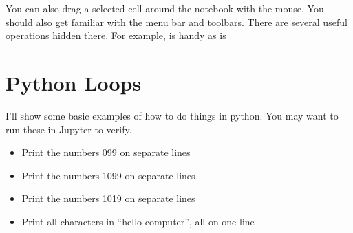 \documentclass[letterpaper,10pt,english]{jupyterBook}
\begin{document}
\sphinxAtStartPar
You can also drag a selected cell around the notebook with the mouse. You should also get familiar with the menu bar and toolbars. There are several useful operations hidden there. For example,  is handy as is 


\section{Python Loops}
\label{\detokenize{lessons/jupyter-python-intro:python-loops}}
\sphinxAtStartPar
I’ll show some basic examples of how to do things in python. You may want to run these in Jupyter to verify.
\begin{itemize}
\item {} 
\sphinxAtStartPar
Print the numbers 0\sphinxhyphen{}99 on separate lines

\begin{sphinxVerbatim}[commandchars=\\\{\}]
   
\end{sphinxVerbatim}

\item {} 
\sphinxAtStartPar
Print the numbers 10\sphinxhyphen{}99 on separate lines

\begin{sphinxVerbatim}[commandchars=\\\{\}]
   
\end{sphinxVerbatim}

\item {} 
\sphinxAtStartPar
Print the  numbers 10\sphinxhyphen{}19 on separate lines

\begin{sphinxVerbatim}[commandchars=\\\{\}]
   
\end{sphinxVerbatim}

\item {} 
\sphinxAtStartPar
Print all characters in “hello computer”, all on one line


\end{itemize}
\end{document}
